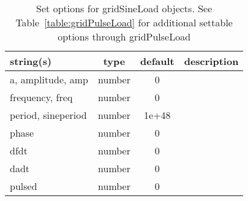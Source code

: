 \begin{table}[ht]
\centering
\begin{tabular}{p{5cm} c c p{7cm}}
\hline
string(s) & type & default & description \\
\hline
a, amplitude, amp & number & 0 & \\
frequency, freq & number & 0 & \\
period, sineperiod & number & 1e+48 & \\
phase & number & 0 & \\
dfdt & number & 0 & \\
dadt & number & 0 & \\
pulsed & number & 0 & \\
\hline
\end{tabular}
\caption{Set options for gridSineLoad objects. See Table~\ref{table:gridPulseLoad} for additional settable options through gridPulseLoad}
\label{table:gridSineLoad}
\end{table}
